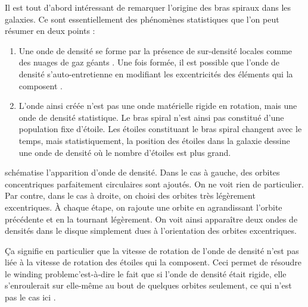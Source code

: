 \bigskip

Il est tout d'abord intéressant de remarquer l'origine des bras spiraux dans les galaxies. Ce sont essentiellement des phénomènes statistiques que l'on peut résumer en deux points : 
\begin{enumerate}
\item Une onde de densité se forme par la présence de sur-densité locales comme des nuages de gaz géants \citep{donghia2013self}. Une fois formée, il est possible que l'onde de densité s'auto-entretienne en modifiant les excentricités des éléments qui la composent \citep{binney2008book}.

\item L'onde ainsi créée n'est pas une onde matérielle rigide en rotation, mais une onde de densité statistique. Le bras spiral n'est ainsi pas constitué d'une population fixe d'étoile. Les étoiles constituant le bras spiral changent avec le temps, mais statistiquement, la position des étoiles dans la galaxie dessine une onde de densité où le nombre d'étoiles est plus grand. 
\end{enumerate}

 schématise l'apparition d'onde de densité. Dans le cas à gauche, des orbites concentriques parfaitement circulaires sont ajoutés. On ne voit rien de particulier. Par contre, dans le cas à droite, on choisi des orbites très légèrement excentriques. À chaque étape, on rajoute une orbite en agrandissant l'orbite précédente et en la tournant légèrement. On voit ainsi apparaître deux ondes de densités dans le disque simplement dues à l'orientation des orbites excentriques.

Ça signifie en particulier que la vitesse de rotation de l'onde de densité n'est pas liée à la vitesse de rotation des étoiles qui la composent. Ceci permet de résoudre le \og winding problem\fg c'est-à-dire le fait que si l'onde de densité était rigide, elle s'enroulerait sur elle-même au bout de quelques orbites seulement, ce qui n'est pas le cas ici \citep{binney2008book}.

